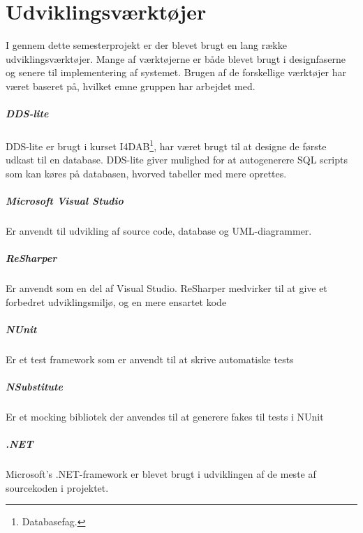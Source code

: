 \chapter{Udviklingsværktøjer}

I gennem dette semesterprojekt er der blevet brugt en lang række udviklingsværktøjer. Mange af værktøjerne er både blevet brugt i designfaserne og senere til implementering af systemet. Brugen af de forskellige værktøjer har været baseret på, hvilket emne gruppen har arbejdet med.

\paragraph{DDS-lite}
DDS-lite er brugt i kurset I4DAB\footnote{Databasefag.}, har været brugt til at designe de første udkast til en database. DDS-lite giver mulighed for at autogenerere SQL scripts som kan køres på databasen, hvorved tabeller med mere oprettes.

\paragraph{Microsoft Visual Studio}
Er anvendt til udvikling af source code, database og UML-diagrammer.

\paragraph{ReSharper} %
Er anvendt som en del af Visual Studio. ReSharper medvirker til at give et forbedret udviklingsmiljø, og en mere ensartet kode 

\paragraph{NUnit}
Er et test framework som er anvendt til at skrive automatiske tests

\paragraph{NSubstitute}
Er et mocking bibliotek der anvendes til at generere fakes til tests i NUnit

\paragraph{.NET}
Microsoft's .NET-framework er blevet brugt i udviklingen af de meste af sourcekoden i projektet.

